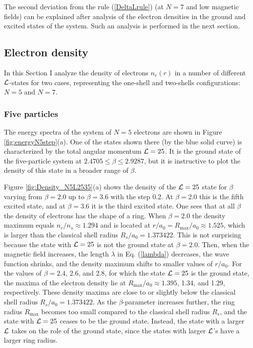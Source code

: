 \documentclass[aps,prb,10pt%
]{revtex4-2}
\begin{document}
The second deviation from the rule (\ref{DeltaLrule}) (at $N=7$ and low magnetic fields) can be explained after analysis of the electron densities in the ground and excited states of the system. Such an analysis is performed in the next section.

\subsection{Electron density\label{sec:ResDensity}}

In this Section I analyze the density of electrons $n_e(r)$ in a number of different ${\cal L}$-states for two cases, representing the one-shell and two-shells configurations: $N=5$ and $N=7$.

\subsubsection{Five particles}

The energy spectra of the system of $N=5$ electrons are shown in Figure \ref{fig:energyN5step}(a). One of the states shown there (by the blue solid curve) is characterized by the total angular momentum ${\cal L}=25$. It is the ground state of the five-particle system at $2.4705\le\beta\le 2.9287$, but it is instructive to plot the density of this state in a broader range of $\beta$. 

Figure \ref{fig:Density_N5L2535}(a) shows the density of the ${\cal L}=25$ state for $\beta$ varying from $\beta=2.0$ up to $\beta=3.6$ with the step 0.2. At $\beta=2.0$ this is the fifth excited state, and at $\beta=3.6$ it is the third excited state. One sees that at all $\beta$ the density of electrons has the shape of a ring. When $\beta=2.0$ the density maximum equals $n_e/n_s\approx 1.294$ and is located at $r/a_0=R_{\max}/a_0\approx 1.525$, which is larger than the classical shell radius $R_s/a_0=1.373422$. This is not surprising because the state with ${\cal L}=25$ is not the ground state at $\beta=2.0$. Then, when the magnetic field increases, the length $\lambda$ in Eq. (\ref{lambda}) decreases, the wave function shrinks, and the density maximum shifts to smaller values of $r/a_0$. For the values of $\beta=2.4$, 2.6, and 2.8, for which the state ${\cal L}=25$ is the ground state, the maxima of the electron density lie at $R_{\max}/a_0\approx 1.395$, 1.34, and 1.29, respectively. These density maxima are close to or slightly below the classical shell radius $R_s/a_0=1.373422$. As the $\beta$-parameter increases further, the ring radius $R_{\max}$ becomes too small compared to the classical shell radius $R_s$, and the state with ${\cal L}=25$ ceases to be the ground state. Instead, the state with a larger ${\cal L}$ takes on the role of the ground state, since the states with larger ${\cal L}$'s have a larger ring radius. 
\end{document}
